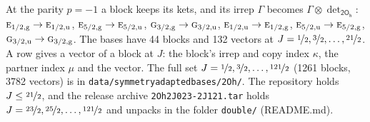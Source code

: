 \documentclass[10pt,a4paper]{article}
\numberwithin{equation}{section}
\newcommand{\grp}[1]{\mathsf{#1}}
\newcommand{\irr}[1]{\text{\normalfont\scshape #1}}
\newcommand{\ptag}[1]{\mathrm{#1}}
\newcommand{\irrprod}{\otimes}
\newcommand{\mult}{\kappa}
\newcommand{\intx}{\mu}
\begin{document}
At the parity $p = -1$ a block keeps its kets, and its irrep $\Gamma$ becomes $\Gamma \irrprod \det_{\grp{2O_{h}}}$: $\irr{e}_{1/2,\ptag{g}} \to \irr{e}_{1/2,\ptag{u}}$, $\irr{e}_{5/2,\ptag{g}} \to \irr{e}_{5/2,\ptag{u}}$, $\irr{g}_{3/2,\ptag{g}} \to \irr{g}_{3/2,\ptag{u}}$, $\irr{e}_{1/2,\ptag{u}} \to \irr{e}_{1/2,\ptag{g}}$, $\irr{e}_{5/2,\ptag{u}} \to \irr{e}_{5/2,\ptag{g}}$, $\irr{g}_{3/2,\ptag{u}} \to \irr{g}_{3/2,\ptag{g}}$.
The bases have 44 blocks and 132 vectors at $J = \nicefrac{1}{2}, \nicefrac{3}{2}, \dots, \nicefrac{21}{2}$. \label{n:head.vector}A row gives a vector of a block at $J$: the block's irrep and copy index $\mult$, the partner index $\intx$ and the vector. The full set $J = \nicefrac{1}{2}, \nicefrac{3}{2}, \dots, \nicefrac{121}{2}$ (1261 blocks, 3782 vectors) is in \texttt{data/symmetryadaptedbases/2Oh/}. The repository holds $J \le \nicefrac{21}{2}$, and the release archive \texttt{2Oh2J023-2J121.tar} holds $J = \nicefrac{23}{2}, \nicefrac{25}{2}, \dots, \nicefrac{121}{2}$ and unpacks in the folder \texttt{double/} (README.md).
\end{document}

